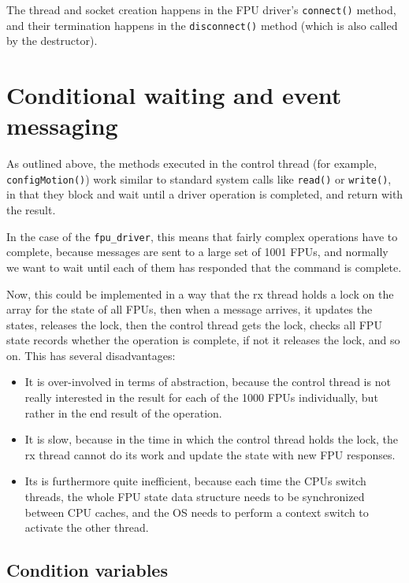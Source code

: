 \documentclass[fontsize=12,a4paper]{scrartcl}
\begin{document}
The thread and socket creation happens in the FPU driver's
\texttt{connect()} method, and their termination happens in the
\texttt{disconnect()} method (which is also called by the destructor).




\section{Conditional waiting and event messaging}

As outlined above, the methods executed in the control thread (for
example, \texttt{configMotion()}) work similar to standard system
calls like \texttt{read()} or \texttt{write()}, in that they block
and wait until a driver operation is completed, and return with the
result.

In the case of the \texttt{fpu\_driver}, this means that fairly complex
operations have to complete, because messages are sent to a large set
of 1001 FPUs, and normally we want to wait until each of them has
responded that the command is complete.

Now, this could be implemented in a way that the rx thread holds a
lock on the array for the state of all FPUs, then when a message
arrives, it updates the states, releases the lock, then the control
thread gets the lock, checks all FPU state records whether the
operation is complete, if not it releases the lock, and so on. This
has several disadvantages:

\begin{itemize}
\item It is over-involved in terms of abstraction, because the control
  thread is not really interested in the result for each of the 1000
  FPUs individually, but rather in the end result of the operation.
\item It is slow, because in the time in which the control thread holds
  the lock, the rx thread cannot do its work and update the
  state with new FPU responses.
\item Its is furthermore quite inefficient, because each time the CPUs
  switch threads, the whole FPU state data structure needs to be
  synchronized between CPU caches, and the OS needs to perform a
  context switch to activate the other thread.
\end{itemize}

\subsection{Condition variables}
\end{document}
